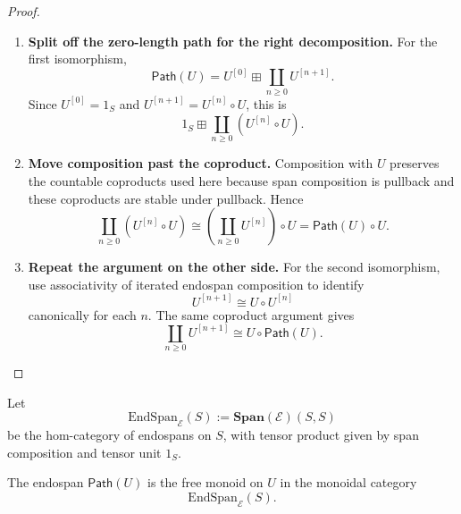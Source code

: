 \begin{proof}
\begin{enumerate}
  \item \textbf{Split off the zero-length path for the right decomposition.}
  For the first isomorphism,
  \[
    \mathsf{Path}(U)
    =
    U^{[0]}\boxplus\coprod_{n\geq 0}U^{[n+1]}.
  \]
  Since \(U^{[0]}=1_S\) and \(U^{[n+1]}=U^{[n]}\circ U\), this is
  \[
    1_S
    \boxplus
    \coprod_{n\geq 0}(U^{[n]}\circ U).
  \]

  \item \textbf{Move composition past the coproduct.}
  Composition with \(U\) preserves the countable coproducts used here because
  span composition is pullback and these coproducts are stable under pullback.
  Hence
  \[
    \coprod_{n\geq 0}(U^{[n]}\circ U)
    \cong
    \left(\coprod_{n\geq 0}U^{[n]}\right)\circ U
    =
    \mathsf{Path}(U)\circ U.
  \]

  \item \textbf{Repeat the argument on the other side.}
  For the second isomorphism, use associativity of iterated endospan
  composition to identify
  \[
    U^{[n+1]}\cong U\circ U^{[n]}
  \]
  canonically for each \(n\). The same coproduct argument gives
  \[
    \coprod_{n\geq 0}U^{[n+1]}
    \cong
    U\circ\mathsf{Path}(U).
  \]
\end{enumerate}
\end{proof}

Let
\[
  \mathrm{EndSpan}_{\mathcal E}(S)
  :=
  \mathbf{Span}(\mathcal E)(S,S)
\]
be the hom-category of endospans on \(S\), with tensor product given by span
composition and tensor unit \(1_S\).

\begin{theorem}
\label{thm:free-endospan-monoid-feedback}
The endospan \(\mathsf{Path}(U)\) is the free monoid on \(U\) in the monoidal
category
\[
  \mathrm{EndSpan}_{\mathcal E}(S).
\]
\end{theorem}

